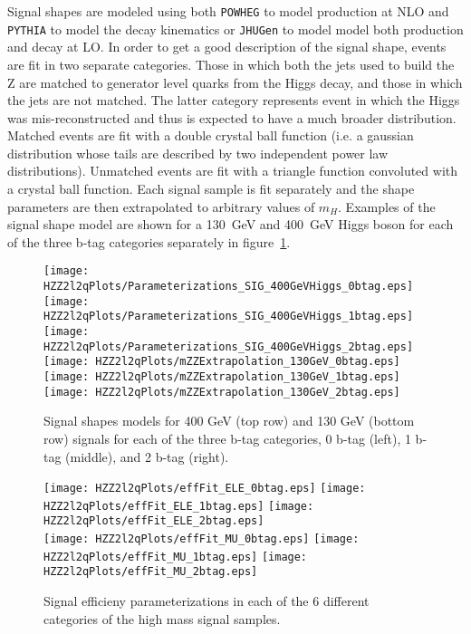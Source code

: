 Signal shapes are modeled using both
{\verb+POWHEG+} to model production at NLO and {\verb+PYTHIA+} to model the 
decay kinematics or {\verb+JHUGen+} to model model both production and
decay at LO.  In order to get a good description of the signal
shape, events are fit in two separate categories.  Those in which 
both the jets used to build the Z are matched to generator level 
quarks from the Higgs decay, and those in which the jets are not 
matched.  The latter category represents event in which the Higgs 
was mis-reconstructed and thus is expected to have a much broader 
distribution.  Matched events are fit with a double crystal ball
function (i.e. a gaussian distribution whose tails are described
by two independent power law distributions).  Unmatched events
are fit with a triangle function convoluted with a crystal ball 
function.  Each signal sample is fit separately and the shape 
parameters are then extrapolated to arbitrary values of $m_H$.  
Examples of the signal shape model are shown for a 130~GeV and
400~GeV Higgs boson for each of the three b-tag categories
separately in figure~\ref{fig:signalShapeModels}.

\begin{figure}
\begin{center}
\texttt{[image: HZZ2l2qPlots/Parameterizations\_SIG\_400GeVHiggs\_0btag.eps]}
\texttt{[image: HZZ2l2qPlots/Parameterizations\_SIG\_400GeVHiggs\_1btag.eps]}
\texttt{[image: HZZ2l2qPlots/Parameterizations\_SIG\_400GeVHiggs\_2btag.eps]}
\texttt{[image: HZZ2l2qPlots/mZZExtrapolation\_130GeV\_0btag.eps]}
\texttt{[image: HZZ2l2qPlots/mZZExtrapolation\_130GeV\_1btag.eps]}
\texttt{[image: HZZ2l2qPlots/mZZExtrapolation\_130GeV\_2btag.eps]}

\caption{Signal shapes models for 400 GeV (top row) and 130 GeV (bottom row) signals for each of the three b-tag categories, 0 b-tag (left), 1 b-tag (middle), and 2 b-tag (right).}
\label{fig:signalShapeModels}
\end{center}
\end{figure}

\begin{figure}
\begin{center}
\texttt{[image: HZZ2l2qPlots/effFit\_ELE\_0btag.eps]}
\texttt{[image: HZZ2l2qPlots/effFit\_ELE\_1btag.eps]}
\texttt{[image: HZZ2l2qPlots/effFit\_ELE\_2btag.eps]}\\
\texttt{[image: HZZ2l2qPlots/effFit\_MU\_0btag.eps]}
\texttt{[image: HZZ2l2qPlots/effFit\_MU\_1btag.eps]}
\texttt{[image: HZZ2l2qPlots/effFit\_MU\_2btag.eps]}
\caption{Signal efficieny parameterizations in each of the 6
different categories of the high mass signal samples.}
\label{fig:efficiencyHighMass}
\end{center}
\end{figure}

